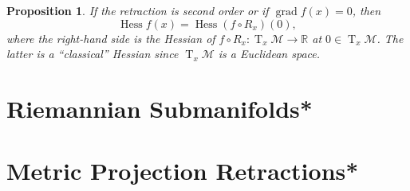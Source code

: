 \documentclass{article}
\theoremstyle{plain}
\newtheorem{proposition}[theorem]{Proposition}
\theoremstyle{definition}
\newcommand{\Tang}[2]{\operatorname{T}_{#1}{\mathcal{#2}}}
\def\bbR{\mathbb{R}}
\begin{document}
\begin{proposition}
If the retraction is second order or if $\operatorname{grad}f(x) = 0$, then 
$$\operatorname{Hess}f(x) = \operatorname{Hess}(f \circ R_x)(0),$$ 
where the right-hand side is the Hessian of $f \circ R_x : \Tang{x}{M} \to \bbR$ at $0 \in \Tang{x}{M}$. The latter is a “classical” Hessian since $\Tang{x}{M}$ is a Euclidean space. 
\end{proposition}

\section{Riemannian Submanifolds*}
\section{Metric Projection Retractions*}
\end{document}
